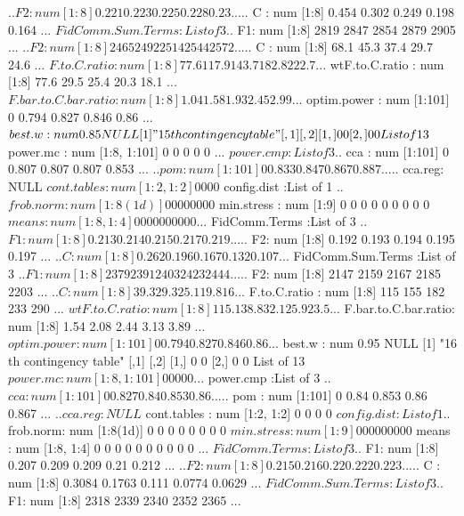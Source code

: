 \documentclass[11pt]{article} %
\begin{document}
\begin{Schunk}
\begin{Soutput}
  ..$ F2: num [1:8] 0.221 0.223 0.225 0.228 0.23 ...
  ..$ C : num [1:8] 0.454 0.302 0.249 0.198 0.164 ...
 $ FidComm.Sum.Terms   :List of 3
  ..$ F1: num [1:8] 2819 2847 2854 2879 2905 ...
  ..$ F2: num [1:8] 2465 2492 2514 2544 2572 ...
  ..$ C : num [1:8] 68.1 45.3 37.4 29.7 24.6 ...
 $ F.to.C.ratio        : num [1:8] 77.6 117.9 143.7 182.8 222.7 ...
 $ wtF.to.C.ratio      : num [1:8] 77.6 29.5 25.4 20.3 18.1 ...
 $ F.bar.to.C.bar.ratio: num [1:8] 1.04 1.58 1.93 2.45 2.99 ...
 $ optim.power         : num [1:101] 0 0.794 0.827 0.846 0.86 ...
 $ best.w              : num 0.85
NULL
[1] "15 th contingency table"
     [,1] [,2]
[1,]    0    0
[2,]    0    0
List of 13
 $ power.mc            : num [1:8, 1:101] 0 0 0 0 0 ...
 $ power.cmp           :List of 3
  ..$ cca    : num [1:101] 0 0.807 0.807 0.807 0.853 ...
  ..$ pom    : num [1:101] 0 0.833 0.847 0.867 0.887 ...
  ..$ cca.reg: NULL
 $ cont.tables         : num [1:2, 1:2] 0 0 0 0
 $ config.dist         :List of 1
  ..$ frob.norm: num [1:8(1d)] 0 0 0 0 0 0 0 0
 $ min.stress          : num [1:9] 0 0 0 0 0 0 0 0 0
 $ means               : num [1:8, 1:4] 0 0 0 0 0 0 0 0 0 0 ...
 $ FidComm.Terms       :List of 3
  ..$ F1: num [1:8] 0.213 0.214 0.215 0.217 0.219 ...
  ..$ F2: num [1:8] 0.192 0.193 0.194 0.195 0.197 ...
  ..$ C : num [1:8] 0.262 0.196 0.167 0.132 0.107 ...
 $ FidComm.Sum.Terms   :List of 3
  ..$ F1: num [1:8] 2379 2391 2403 2423 2444 ...
  ..$ F2: num [1:8] 2147 2159 2167 2185 2203 ...
  ..$ C : num [1:8] 39.3 29.3 25.1 19.8 16 ...
 $ F.to.C.ratio        : num [1:8] 115 155 182 233 290 ...
 $ wtF.to.C.ratio      : num [1:8] 115.1 38.8 32.1 25.9 23.5 ...
 $ F.bar.to.C.bar.ratio: num [1:8] 1.54 2.08 2.44 3.13 3.89 ...
 $ optim.power         : num [1:101] 0 0.794 0.827 0.846 0.86 ...
 $ best.w              : num 0.95
NULL
[1] "16 th contingency table"
     [,1] [,2]
[1,]    0    0
[2,]    0    0
List of 13
 $ power.mc            : num [1:8, 1:101] 0 0 0 0 0 ...
 $ power.cmp           :List of 3
  ..$ cca    : num [1:101] 0 0.827 0.84 0.853 0.86 ...
  ..$ pom    : num [1:101] 0 0.84 0.853 0.86 0.867 ...
  ..$ cca.reg: NULL
 $ cont.tables         : num [1:2, 1:2] 0 0 0 0
 $ config.dist         :List of 1
  ..$ frob.norm: num [1:8(1d)] 0 0 0 0 0 0 0 0
 $ min.stress          : num [1:9] 0 0 0 0 0 0 0 0 0
 $ means               : num [1:8, 1:4] 0 0 0 0 0 0 0 0 0 0 ...
 $ FidComm.Terms       :List of 3
  ..$ F1: num [1:8] 0.207 0.209 0.209 0.21 0.212 ...
  ..$ F2: num [1:8] 0.215 0.216 0.22 0.222 0.223 ...
  ..$ C : num [1:8] 0.3084 0.1763 0.111 0.0774 0.0629 ...
 $ FidComm.Sum.Terms   :List of 3
  ..$ F1: num [1:8] 2318 2339 2340 2352 2365 ...

\end{Soutput}
\end{Schunk}
\end{document}
